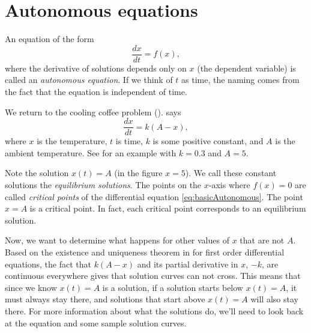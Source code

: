 \section{Autonomous equations}
\label{auteq:section}



\begin{definition} \label{def:autonomousEqn}
An equation of the form
\begin{equation}
\frac{dx}{dt} = f(x) , \label{eq:basicAutonomous}
\end{equation}
where the derivative of solutions depends only on $x$ (the dependent
variable) is called an \emph{autonomous
equation}. If we think
of $t$ as time, the naming comes from the fact that the equation is
independent of time.
\end{definition}

We return to the cooling coffee problem
().
says
\begin{equation*}
\frac{dx}{dt} = k (A-x) ,
\end{equation*}
where $x$ is the temperature, $t$ is time, $k$ is some positive constant,
and $A$ is
the ambient temperature.  See  for an example
with $k=0.3$ and $A=5$.

Note the solution $x(t)=A$ (in the figure $x=5$).
We call these constant solutions the
\emph{equilibrium solutions}.
The points on the $x$-axis where $f(x) = 0$ are called
\emph{critical points} of the differential equation \eqref{eq:basicAutonomous}.  The point
$x=A$ is a critical point.  In fact, each
critical point corresponds to an equilibrium solution.

Now, we want to determine what happens for other values of $x$ that are not $A$. Based on the existence and uniqueness theorem in  for first order differential equations, the fact that $k(A-x)$ and its partial derivative in $x$, $-k$, are continuous everywhere gives that solution curves can not cross. This means that since we know $x(t)=A$ is a solution, if a solution starts below $x(t)=A$, it must always stay there, and solutions that start above $x(t)=A$ will also stay there. For more information about what the solutions do, we'll need to look back at the equation and some sample solution curves.

